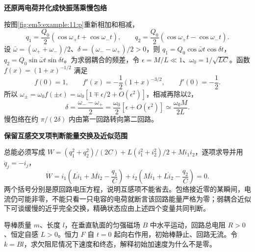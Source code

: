 \begin{solution}
\par\medskip{}\noindent\textbf{还原两电荷并化成快振荡乘慢包络}\par\nobreak
按图\ref{fig:em5:example:11:p}重新相加和相减，
\[q_1=\frac{Q_0}{2}(\cos\omega_+t+\cos\omega_-t),\qquad q_2=\frac{Q_0}{2}(\cos\omega_+t-\cos\omega_-t).\]
设 $\bar\omega=(\omega_++\omega_-)/2$、$\delta=(\omega_--\omega_+)/2>0$，则 $q_1=Q_0\cos\bar\omega t\cos\delta t$，$q_2=Q_0\sin\bar\omega t\sin\delta t$。为求弱耦合的频差，令 $\epsilon=M/L\ll1$、$\omega_0=1/\sqrt{LC}$。函数 $f(x)=(1+x)^{-1/2}$ 满足
\[
 f(0)=1,\qquad f'(x)=-\frac12(1+x)^{-3/2},\qquad f'(0)=-\frac12.
\]
所以 $\omega_\pm=\omega_0f(\pm\epsilon)
=\omega_0[1\mp\epsilon/2+O(\epsilon^2)]$，相减再除以2，
\[
 \delta=\frac{\omega_- -\omega_+}{2}
 =\frac{\omega_0}{2}[\epsilon+O(\epsilon^2)]
 \simeq\frac{\omega_0M}{2L}.
\]
慢包络在约 $\pi/(2\delta)$ 内由第一回路转向第二回路。



\par\medskip{}\noindent\textbf{保留互感交叉项判断能量交换及近似范围}\par\nobreak
总能必须写成 $W=(q_1^2+q_2^2)/(2C)+L(i_1^2+i_2^2)/2+Mi_1i_2$，逐项求导并用 $\dot q_j=-i_j$，
\[
\dot W=i_1\left(L\dot i_1+M\dot i_2-\frac{q_1}{C}\right)
+i_2\left(M\dot i_1+L\dot i_2-\frac{q_2}{C}\right)=0.
\]
两个括号分别是原回路电压方程，说明互感项不能省去。包络接近零的某瞬间，电流仍可能非零，不能只看一只电容的电荷就断言该回路能量严格为零；弱耦合近似下可谈缓慢的近乎完全交换，精确状态应由上述四个变量共同判断。\end{solution}
\begin{question}\begin{example}[含回路自感的恒力导棒]\label{em5:example:12}
导棒质量 $m$、长度 $l$，在垂直轨面的匀强磁场 $B$ 中水平运动，回路总电阻 $R>0$、恒定自感 $L>0$。恒力 $F$ 自 $t=0$ 起向右作用，初始棒静止、回路无流。令 $k=Bl$，求欠阻尼情况下速度和终态，解释初始加速度为什么不是零。
\end{example}
\end{question}
